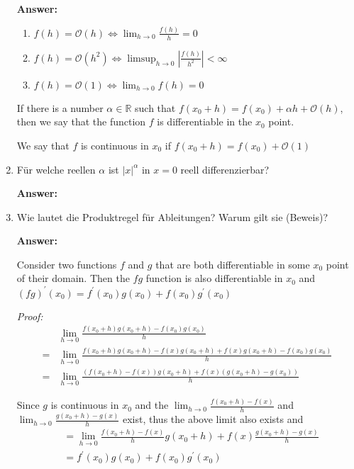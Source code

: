 \documentclass[11pt]{article}
\newcommand{\abs}[1]{\left|#1\right|}
\newcommand{\RR}[0]{\mathbb{R}}
\newcommand{\smallo}[0]{{\scriptstyle \mathcal{O}}}
\begin{document}
\begin{enumerate}
    \textbf{Answer:}
    \begin{enumerate}
        \item $f(h) = \smallo(h) \Leftrightarrow \lim_{h\to0}\frac{f(h)}{h} = 0$
        \item $f(h) = \mathcal{O}(h^2) \Leftrightarrow \limsup_{h\to0}\abs{\frac{f(h)}{h^2}} < \infty$
        \item $f(h) = \smallo(1) \Leftrightarrow \lim_{h\to0} f(h) = 0$
    \end{enumerate}

    If there is a number $\alpha \in \RR$ such that $f(x_0+h) = f(x_0) + \alpha h + \smallo(h)$, then we say that the function $f$ is differentiable in the $x_0$ point.

    We say that $f$ is continuous in $x_0$ if $f(x_0 + h) = f(x_0) + \smallo(1)$

    \item Für welche reellen $\alpha$ ist $\abs{x}^\alpha$ in $x = 0$ reell differenzierbar?
    
    \textbf{Answer:}
    \item Wie lautet die Produktregel für Ableitungen? Warum gilt sie (Beweis)?
    
    \textbf{Answer:}

    Consider two functions $f$ and $g$ that are both differentiable in some $x_0$ point of their domain. Then the $f g$ function is also differentiable in $x_0$ and $(f g)^\prime(x_0) = f^\prime(x_0) g(x_0) + f(x_0) g^\prime(x_0)$
    
    \textit{Proof:}
    $$\begin{aligned}
        &\lim_{h\to0}\frac{f(x_0 + h)g(x_0 + h) - f(x_0)g(x_0)}{h} \\
        =&\lim_{h\to0}\frac{f(x_0 + h)g(x_0 + h) - f(x)g(x_0 + h) + f(x)g(x_0 + h)- f(x_0)g(x_0)}{h}\\
        =&\lim_{h\to0}\frac{(f(x_0 + h)- f(x))g(x_0 + h) + f(x)(g(x_0 + h)- g(x_0))}{h}
    \end{aligned}$$

    Since $g$ is continuous in $x_0$ and the $\lim_{h\to0}\frac{f(x_0 + h)- f(x)}{h}$ and $\lim_{h\to0}\frac{g(x_0 + h)- g(x)}{h}$ exist, thus the above limit also exists and 
    $$\begin{aligned}&= \lim_{h\to0}\frac{f(x_0 + h)- f(x)}{h} g(x_0 + h) + f(x)\frac{g(x_0 + h)- g(x)}{h} \\&=f^\prime(x_0) g(x_0) + f(x_0) g^\prime(x_0)\end{aligned}$$


\end{enumerate}
\end{document}
